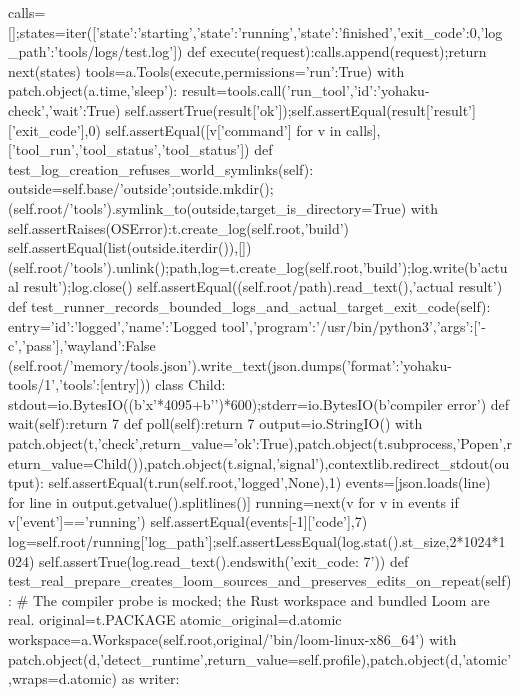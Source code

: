         calls=[];states=iter([{'state':'starting'},{'state':'running'},{'state':'finished','exit_code':0,'log_path':'tools/logs/test.log'}])
        def execute(request):calls.append(request);return next(states)
        tools=a.Tools(execute,permissions={'run':True})
        with patch.object(a.time,'sleep'):
            result=tools.call('run_tool',{'id':'yohaku-check','wait':True})
        self.assertTrue(result['ok']);self.assertEqual(result['result']['exit_code'],0)
        self.assertEqual([v['command'] for v in calls],['tool_run','tool_status','tool_status'])
    def test_log_creation_refuses_world_symlinks(self):
        outside=self.base/'outside';outside.mkdir();(self.root/'tools').symlink_to(outside,target_is_directory=True)
        with self.assertRaises(OSError):t.create_log(self.root,'build')
        self.assertEqual(list(outside.iterdir()),[])
        (self.root/'tools').unlink();path,log=t.create_log(self.root,'build');log.write(b'actual result\n');log.close()
        self.assertEqual((self.root/path).read_text(),'actual result\n')
    def test_runner_records_bounded_logs_and_actual_target_exit_code(self):
        entry={'id':'logged','name':'Logged tool','program':'/usr/bin/python3','args':['-c','pass'],'wayland':False}
        (self.root/'memory/tools.json').write_text(json.dumps({'format':'yohaku-tools/1','tools':[entry]}))
        class Child:
            stdout=io.BytesIO((b'x'*4095+b'\n')*600);stderr=io.BytesIO(b'compiler error\n')
            def wait(self):return 7
            def poll(self):return 7
        output=io.StringIO()
        with patch.object(t,'check',return_value={'ok':True}),patch.object(t.subprocess,'Popen',return_value=Child()),patch.object(t.signal,'signal'),contextlib.redirect_stdout(output):
            self.assertEqual(t.run(self.root,'logged',None),1)
        events=[json.loads(line) for line in output.getvalue().splitlines()]
        running=next(v for v in events if v['event']=='running')
        self.assertEqual(events[-1]['code'],7)
        log=self.root/running['log_path'];self.assertLessEqual(log.stat().st_size,2*1024*1024)
        self.assertTrue(log.read_text().endswith('exit_code: 7\n'))
    def test_real_prepare_creates_loom_sources_and_preserves_edits_on_repeat(self):
        # The compiler probe is mocked; the Rust workspace and bundled Loom are real.
        original=t.PACKAGE
        atomic_original=d.atomic
        workspace=a.Workspace(self.root,original/'bin/loom-linux-x86_64')
        with patch.object(d,'detect_runtime',return_value=self.profile),patch.object(d,'atomic',wraps=d.atomic) as writer:
